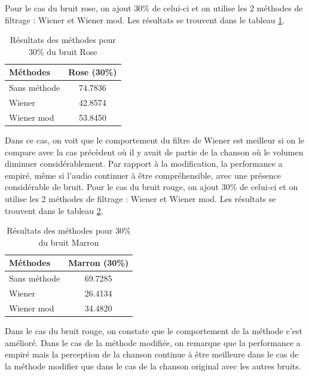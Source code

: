 \documentclass[conference,onecolumn]{IEEEtran}
\begin{document}
Pour le cas du bruit rose, on ajout 30\% de celui-ci et on utilise les 2 méthodes de filtrage : Wiener et Wiener mod. Les résultats se trouvent dans le tableau \ref{table:t14}.
\begin{table}[H]
    \centering
    \begin{tabular}{ l  c }
    \textbf{Méthodes} & \textbf{Rose (30\%)} \\
    \hline
    Sans méthode &  74.7836\\
    Wiener & 42.8574 \\
    Wiener mod & 53.8450 \\
    \end{tabular}
    \caption{Résultats des méthodes pour 30\% du bruit Rose}
    \label{table:t14}
\end{table}
Dans ce cas, on voit que le comportement du filtre de Wiener est meilleur si on le compare avec la cas précèdent où il y avait de partie de la chanson où le volumen diminuer considérablement. Par rapport à la modification, la performance a empiré, même si l’audio continuer à être compréhensible, avec une présence considérable de bruit.\medskip
Pour le cas du bruit rouge, on ajout 30\% de celui-ci et on utilise les 2 méthodes de filtrage : Wiener et Wiener mod. Les résultats se trouvent dans le tableau \ref{table:t15}.

\begin{table}[H]
    \centering
    \begin{tabular}{ l  c }
    \textbf{Méthodes} & \textbf{Marron (30\%)} \\
    \hline
    Sans méthode &  69.7285\\
    Wiener &  26.4134\\
    Wiener mod & 34.4820 \\
    \end{tabular}
    \caption{Résultats des méthodes pour 30\% du bruit Marron}
    \label{table:t15}
\end{table}
Dans le cas du bruit rouge, on constate que le comportement de la méthode c’est amélioré. Dans le cas de la méthode modifiée, on remarque que la performance a empiré mais la perception de la chanson continue à être meilleure dans le cas de la méthode modifier que dans le cas de la chanson original avec les autres bruits.

\medskip
\end{document}
